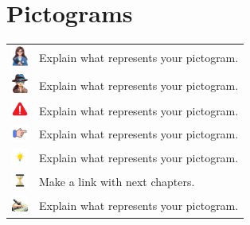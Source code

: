 \section*{Pictograms}
\begin{longtable}{>{\raggedright}p{6cm}p{12cm}}
    \includegraphics[width=15pt]{figs/eve.pdf} & Explain what represents your pictogram.\\
    \includegraphics[width=15pt]{figs/alice.pdf} & Explain what represents your pictogram. \\
    \includegraphics[width=15pt]{figs/warning.pdf} & Explain what represents your pictogram.\\
    \includegraphics[width=15pt]{figs/hypothesis.pdf} & Explain what represents your pictogram.\\
    \includegraphics[width=15pt]{figs/idea.pdf} & Explain what represents your pictogram. \\
    \includegraphics[width=15pt]{figs/sablier.pdf} & Make a  link with next chapters.\\
    \includegraphics[width=15pt]{figs/writing.pdf} & Explain what represents your pictogram.\\
\end{longtable}



